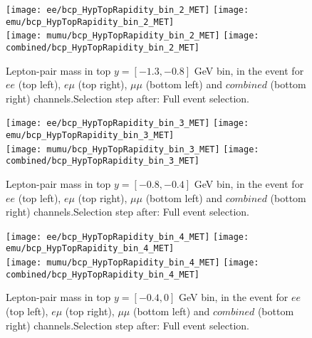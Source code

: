 \documentclass[12pt, a4paper, titlepage]{article}
\begin{document}
\clearpage
\newpage


\begin{figure}
  \texttt{[image: ee/bcp\_HypTopRapidity\_bin\_2\_MET]}
  \texttt{[image: emu/bcp\_HypTopRapidity\_bin\_2\_MET]}\\
  \texttt{[image: mumu/bcp\_HypTopRapidity\_bin\_2\_MET]}
  \texttt{[image: combined/bcp\_HypTopRapidity\_bin\_2\_MET]}
\caption{Lepton-pair mass in top $y = [-1.3,-0.8]$ GeV bin, in the event for $ee$ (top left), $e\mu$ (top right), $\mu\mu$ (bottom left) and $combined$ (bottom right) channels.\newline Selection step after: Full event selection.}
\end{figure}

\clearpage
\newpage


\begin{figure}
  \texttt{[image: ee/bcp\_HypTopRapidity\_bin\_3\_MET]}
  \texttt{[image: emu/bcp\_HypTopRapidity\_bin\_3\_MET]}\\
  \texttt{[image: mumu/bcp\_HypTopRapidity\_bin\_3\_MET]}
  \texttt{[image: combined/bcp\_HypTopRapidity\_bin\_3\_MET]}
\caption{Lepton-pair mass in top $y = [-0.8,-0.4]$ GeV bin, in the event for $ee$ (top left), $e\mu$ (top right), $\mu\mu$ (bottom left) and $combined$ (bottom right) channels.\newline Selection step after: Full event selection.}
\end{figure}

\clearpage
\newpage

\begin{figure}
  \texttt{[image: ee/bcp\_HypTopRapidity\_bin\_4\_MET]}
  \texttt{[image: emu/bcp\_HypTopRapidity\_bin\_4\_MET]}\\
  \texttt{[image: mumu/bcp\_HypTopRapidity\_bin\_4\_MET]}
  \texttt{[image: combined/bcp\_HypTopRapidity\_bin\_4\_MET]}
\caption{Lepton-pair mass in top $y = [-0.4,0]$ GeV bin, in the event for $ee$ (top left), $e\mu$ (top right), $\mu\mu$ (bottom left) and $combined$ (bottom right) channels.\newline Selection step after: Full event selection.}
\end{figure}

\clearpage
\newpage
\end{document}
